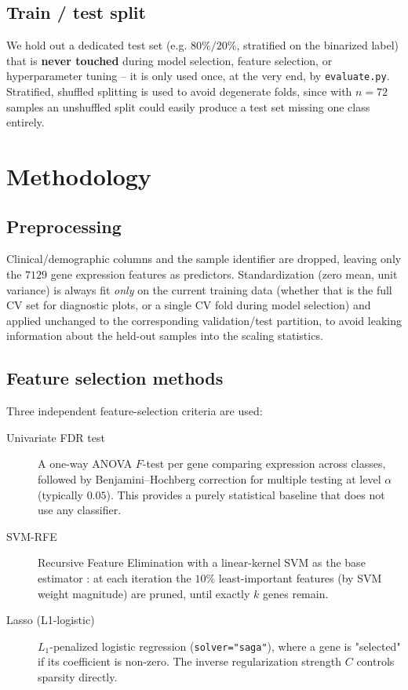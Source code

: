 \documentclass[11pt,a4paper]{article}
\begin{document}
\subsection{Train / test split}
We hold out a dedicated test set (e.g. $80\%/20\%$, stratified on the binarized label) that is \textbf{never touched} during model selection, feature selection, or hyperparameter tuning -- it is only used once, at the very end, by \texttt{evaluate.py}.
Stratified, shuffled splitting is used to avoid degenerate folds, since with $n=72$ samples an unshuffled split could easily produce a test set missing one class entirely.

\section{Methodology}

\subsection{Preprocessing}
Clinical/demographic columns and the sample identifier are dropped, leaving only the $7129$ gene expression features as predictors.
Standardization (zero mean, unit variance) is always fit \emph{only} on the current training data (whether that is the full CV set for diagnostic plots, or a single CV fold during model selection) and applied unchanged to the corresponding validation/test partition, to avoid leaking information about the held-out samples into the scaling statistics.

\subsection{Feature selection methods}
Three independent feature-selection criteria are used:

\begin{description}
    \item[Univariate FDR test] A one-way ANOVA $F$-test per gene comparing expression across classes, followed by Benjamini--Hochberg correction for multiple testing at level $\alpha$ (typically $0.05$). This provides a purely statistical baseline that does not use any classifier.
    \item[SVM-RFE] Recursive Feature Elimination with a linear-kernel SVM as the base estimator \cite{guyon2002gene}: at each iteration the $10\%$ least-important features (by SVM weight magnitude) are pruned, until exactly $k$ genes remain.
    \item[Lasso (L1-logistic)] $L_1$-penalized logistic regression (\texttt{solver="saga"}), where a gene is "selected" if its coefficient is non-zero. The inverse regularization strength $C$ controls sparsity directly.
\end{description}
\end{document}
